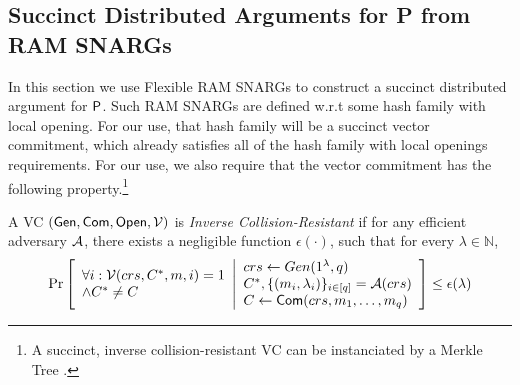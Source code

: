 %



\subsection{Succinct Distributed Arguments for P from RAM SNARGs}\label{app:dargsForP}
In this section we use Flexible RAM SNARGs to construct a succinct distributed argument for ${\mathsf{P}}$. Such RAM SNARGs are defined w.r.t some hash family with local opening. For our use, that hash family will be a succinct vector commitment, which already satisfies all of the hash family with local openings requirements. For our use, we also require that the vector commitment has the following property.\footnote{
A succinct, inverse collision-resistant VC can be instanciated by a Merkle Tree \cite{merkle1989certified}.
}
\begin{definition}
A VC $(\mathsf{Gen}, \mathsf{Com}, \mathsf{Open}, \mathcal{V})$ is \emph{Inverse Collision-Resistant} if for any efficient adversary $\mathcal{A}$, there exists a negligible function $\epsilon(\cdot)$, such that for every $\lambda\in \mathbb{N}$,
\begin{gather*}
    \underset{}{\text{Pr}}\left [
    \begin{array}{ll}
         \forall i: \mathcal{V}(crs, C^*, m, i) = 1 \\
         \wedge C^* \neq C
    \end{array}
    \middle\vert
    \begin{array}{ll}
         crs \leftarrow Gen(1^\lambda, q) \\
         C^*, \{(m_i, \lambda_i)\}_{i\in [q]} = \mathcal{A}(crs) \\
         C \leftarrow \mathsf{Com}(crs, m_1,\ldots,m_q)
    \end{array}
    \right ] \leq \epsilon(\lambda)
\end{gather*}
\end{definition}

